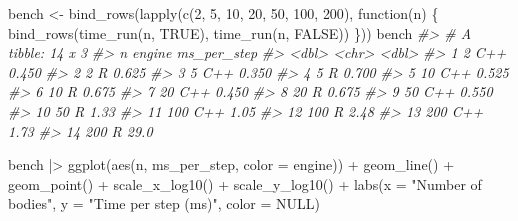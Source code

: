\documentclass[
  10.5pt,
  letterpaper,
]{scrbook}
\newenvironment{Shaded}{\begin{snugshade}}{\end{snugshade}}
\newcommand{\AttributeTok}[1]{\textcolor[rgb]{0.00,0.00,0.00}{#1}}
\newcommand{\CommentTok}[1]{\textcolor[rgb]{0.00,0.00,0.00}{\textit{#1}}}
\newcommand{\ConstantTok}[1]{\textcolor[rgb]{0.00,0.00,0.00}{#1}}
\newcommand{\ControlFlowTok}[1]{\textcolor[rgb]{0.00,0.00,0.00}{#1}}
\newcommand{\DecValTok}[1]{\textcolor[rgb]{0.00,0.00,0.00}{#1}}
\newcommand{\FunctionTok}[1]{\textcolor[rgb]{0.00,0.00,0.00}{#1}}
\newcommand{\NormalTok}[1]{\textcolor[rgb]{0.00,0.00,0.00}{#1}}
\newcommand{\OtherTok}[1]{\textcolor[rgb]{0.00,0.00,0.00}{#1}}
\newcommand{\SpecialCharTok}[1]{\textcolor[rgb]{0.00,0.00,0.00}{#1}}
\newcommand{\StringTok}[1]{\textcolor[rgb]{0.00,0.00,0.00}{#1}}
\theoremstyle{definition}
\theoremstyle{plain}
\theoremstyle{remark}
\begin{document}
\begin{Shaded}
\begin{Highlighting}[]
\NormalTok{bench }\OtherTok{\textless{}{-}} \FunctionTok{bind\_rows}\NormalTok{(}\FunctionTok{lapply}\NormalTok{(}\FunctionTok{c}\NormalTok{(}\DecValTok{2}\NormalTok{, }\DecValTok{5}\NormalTok{, }\DecValTok{10}\NormalTok{, }\DecValTok{20}\NormalTok{, }\DecValTok{50}\NormalTok{, }\DecValTok{100}\NormalTok{, }\DecValTok{200}\NormalTok{), }\ControlFlowTok{function}\NormalTok{(n) \{}
  \FunctionTok{bind\_rows}\NormalTok{(}\FunctionTok{time\_run}\NormalTok{(n, }\ConstantTok{TRUE}\NormalTok{), }\FunctionTok{time\_run}\NormalTok{(n, }\ConstantTok{FALSE}\NormalTok{))}
\NormalTok{\}))}
\NormalTok{bench}
\CommentTok{\#\textgreater{} \# A tibble: 14 x 3}
\CommentTok{\#\textgreater{}        n engine ms\_per\_step}
\CommentTok{\#\textgreater{}    \textless{}dbl\textgreater{} \textless{}chr\textgreater{}        \textless{}dbl\textgreater{}}
\CommentTok{\#\textgreater{}  1     2 C++          0.450}
\CommentTok{\#\textgreater{}  2     2 R            0.625}
\CommentTok{\#\textgreater{}  3     5 C++          0.350}
\CommentTok{\#\textgreater{}  4     5 R            0.700}
\CommentTok{\#\textgreater{}  5    10 C++          0.525}
\CommentTok{\#\textgreater{}  6    10 R            0.675}
\CommentTok{\#\textgreater{}  7    20 C++          0.450}
\CommentTok{\#\textgreater{}  8    20 R            0.675}
\CommentTok{\#\textgreater{}  9    50 C++          0.550}
\CommentTok{\#\textgreater{} 10    50 R            1.33 }
\CommentTok{\#\textgreater{} 11   100 C++          1.05 }
\CommentTok{\#\textgreater{} 12   100 R            2.48 }
\CommentTok{\#\textgreater{} 13   200 C++          1.73 }
\CommentTok{\#\textgreater{} 14   200 R           29.0}
\end{Highlighting}
\end{Shaded}

\begin{Shaded}
\begin{Highlighting}[]
\NormalTok{bench }\SpecialCharTok{|\textgreater{}}
  \FunctionTok{ggplot}\NormalTok{(}\FunctionTok{aes}\NormalTok{(n, ms\_per\_step, }\AttributeTok{color =}\NormalTok{ engine)) }\SpecialCharTok{+}
  \FunctionTok{geom\_line}\NormalTok{() }\SpecialCharTok{+} \FunctionTok{geom\_point}\NormalTok{() }\SpecialCharTok{+}
  \FunctionTok{scale\_x\_log10}\NormalTok{() }\SpecialCharTok{+} \FunctionTok{scale\_y\_log10}\NormalTok{() }\SpecialCharTok{+}
  \FunctionTok{labs}\NormalTok{(}\AttributeTok{x =} \StringTok{"Number of bodies"}\NormalTok{, }\AttributeTok{y =} \StringTok{"Time per step (ms)"}\NormalTok{, }\AttributeTok{color =} \ConstantTok{NULL}\NormalTok{)}
\end{Highlighting}
\end{Shaded}
\end{document}
